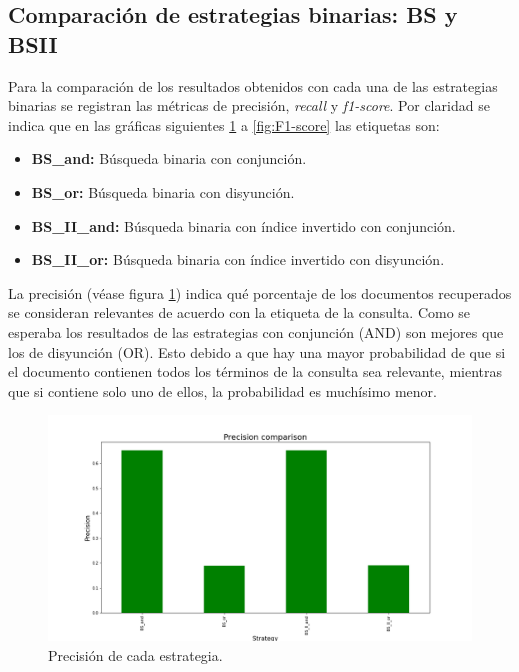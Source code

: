 \subsection{Comparación de estrategias binarias: BS y BSII}

Para la comparación de los resultados obtenidos con cada una de las estrategias binarias se registran las métricas de precisión, \textit{recall} y \textit{f1-score}. Por claridad se indica que en las gráficas siguientes \ref{fig:Precision} a \ref{fig:F1-score} las etiquetas son:
\begin{itemize}
    \item \textbf{BS\_and:} Búsqueda binaria con conjunción.
    \item \textbf{BS\_or:} Búsqueda binaria con disyunción.
    \item \textbf{BS\_II\_and:} Búsqueda binaria con índice invertido con conjunción.
    \item \textbf{BS\_II\_or:} Búsqueda binaria con índice invertido con disyunción.
\end{itemize}

La precisión (véase figura \ref{fig:Precision}) indica qué porcentaje de los documentos recuperados se consideran relevantes de acuerdo con la etiqueta de la consulta. Como se esperaba los resultados de las estrategias con conjunción (AND) son mejores que los de disyunción (OR). Esto debido a que hay una mayor probabilidad de que si el documento contienen todos los términos de la consulta sea relevante, mientras que si contiene solo uno de ellos, la probabilidad es muchísimo menor.\\ 

\begin{figure}[H]
    \centering
    \includegraphics[width=\textwidth]{results/images/BS_precision_comparison.png}
    \caption{Precisión de cada estrategia.}
    \label{fig:Precision}
\end{figure}


